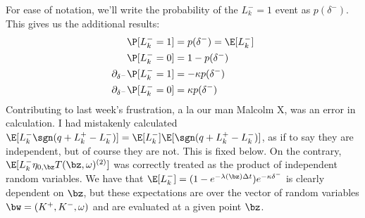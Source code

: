 \documentclass[12pt]{article}
\begin{document}
For ease of notation, we'll write the probability of the $L_k^- = 1$ event as $p(\delta^-)$. This gives us the additional results:
\begin{align*}
\P [ L_k^- = 1] & = p(\delta^-) = \E [ L_k^-] \\
\P [ L_k^- = 0] & = 1 - p(\delta^-) \\
\partial_{\delta^-} \P [ L_k^- = 1]  & = -\kappa p(\delta^-) \\
\partial_{\delta^-} \P [ L_k^- = 0] & = \kappa p(\delta^-) \\
\end{align*}
Contributing to last week's frustration, a la our man Malcolm X, was an error in calculation. I had mistakenly calculated $\E [ L_k^- \sgn(q + L_k^+ - L_k^-)] = \E [ L_k^-] \E[\sgn(q + L_k^+ - L_k^-)]$, as if to say they are independent, but of course they are not. This is fixed below. On the contrary, $\E [ L_k^- \eta_{0,\bz}T(\bz,\omega)^{(2)}]$ was correctly treated as the product of independent random variables. We have that $\E[L_k^-] = ( 1 - e^{-\lambda (\bz) \Delta t} ) e^{-\kappa \delta^-}$ is clearly dependent on $\bz$, but these expectations are over the vector of random variables $\bw = (K^+, K^-, \omega)$ and are evaluated at a given point $\bz$.
\end{document}
